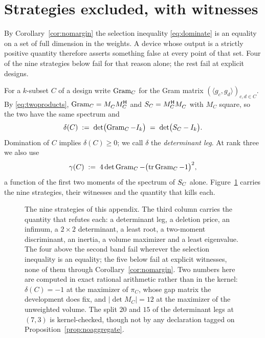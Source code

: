 \section{Strategies excluded, with witnesses}\label{app:graveyard}

By Corollary~\ref{cor:nomargin} the selection inequality
\eqref{eq:dominate} is an equality on a set of full dimension in the
weights.  A device whose output is a strictly positive quantity therefore
asserts something false at every point of that set.  Four of the nine
strategies below fail for that reason alone; the rest fail at explicit
designs.

For a $k$-subset $C$ of a design write $\operatorname{Gram}_C$ for the Gram matrix
$(\langle g_c,g_d\rangle)_{c,d\in C}$.  By \eqref{eq:twoproducts},
$\Gram_C=M_C^{\vphantom{\mathsf{H}}}M_C\adj$ and
$\SC=M_C\adj M_C^{\vphantom{\mathsf{H}}}$ with
$M_C$ square, so the two have the same spectrum and
\begin{equation}\label{eq:tieleg}
  \delta(C)\;:=\;\det\bigl(\operatorname{Gram}_C-I_k\bigr)\;=\;\det\bigl(S_{C}-I_k\bigr) .
\end{equation}
Domination of $C$ implies $\delta(C)\ge0$; we call $\delta$ the
\emph{determinant leg}.  At rank three we also use
\begin{equation}\label{eq:twomoment}
  \gamma(C)\;:=\;4\det\operatorname{Gram}_C-\bigl(\operatorname{tr}\operatorname{Gram}_C-1\bigr)^2 ,
\end{equation}
a function of the first two moments of the spectrum of $S_{C}$ alone.
Figure~\ref{fig:gallery} carries the nine strategies, their witnesses and the
quantity that kills each.

\begin{figure}[htbp]
  \centering
  
  \caption{The nine strategies of this appendix.  The third column carries the
  quantity that refutes each: a determinant leg, a deletion price, an infimum,
  a $2\times2$ determinant, a least root, a two-moment discriminant, an
  inertia, a volume maximizer and a least eigenvalue.  The four above the
  second band fail wherever the selection inequality is an equality; the five
  below fail at explicit witnesses, none of them through
  Corollary~\ref{cor:nomargin}.  Two numbers here are computed in exact rational
  arithmetic rather than in the kernel: $\delta(C)=-1$ at the maximizer of
  $\pi_C$, whose gap matrix the development does fix, and
  $\lvert\det M_C\rvert=12$ at the maximizer of the unweighted volume.  The
  split $20$ and $15$ of the determinant legs at $(7,3)$ is kernel-checked,
  though not by any declaration tagged on
  Proposition~\ref{prop:noaggregate}.}
  \label{fig:gallery}
\end{figure}

